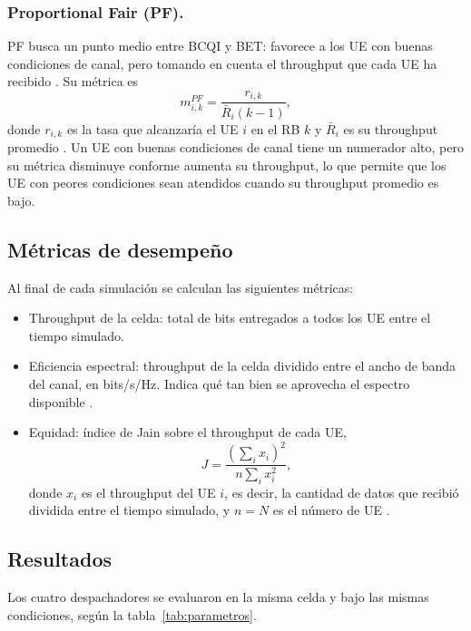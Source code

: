 \subsubsection{Proportional Fair (PF).}
PF busca un punto medio entre BCQI y BET: favorece a los UE con buenas
condiciones de canal, pero tomando en cuenta el throughput que cada UE ha
recibido \citep{capozzi2013,fitriasari2021}. Su métrica es
\begin{equation}
  m^{PF}_{i,k} = \frac{r_{i,k}}{\bar{R}_i(k-1)},
  \label{eq:pf}
\end{equation}
donde $r_{i,k}$ es la tasa que alcanzaría el UE $i$ en el RB $k$ y
$\bar{R}_i$ es su throughput promedio \citep{capozzi2013}.
Un UE con buenas condiciones de canal tiene un numerador
alto, pero su métrica disminuye conforme aumenta su throughput, lo que
permite que los UE con peores condiciones sean atendidos cuando su
throughput promedio es bajo.

\subsection{Métricas de desempeño}\label{subsec:metricas}

Al final de cada simulación se calculan las siguientes métricas:

\begin{itemize}
  \item Throughput de la celda: total de bits entregados a todos los UE
    entre el tiempo simulado.
  \item Eficiencia espectral: throughput de la celda dividido entre el
    ancho de banda del canal, en bits/s/Hz. Indica qué tan bien se
    aprovecha el espectro disponible \citep{mamane2022}.
  \item Equidad: índice de Jain sobre el throughput de cada UE,
    \begin{equation}
      J = \frac{\left(\sum_{i} x_i\right)^2}{n \sum_{i} x_i^2},
      \label{eq:jain}
    \end{equation}
    donde $x_i$ es el throughput del UE $i$, es decir, la cantidad de
    datos que recibió dividida entre el tiempo simulado, y $n = N$ es el
    número de UE \citep{shi2014}.
\end{itemize}
\subsection{Resultados}\label{sec:resultados}

Los cuatro despachadores se evaluaron en la misma celda y bajo las mismas
condiciones, según la tabla~\ref{tab:parametros}.

